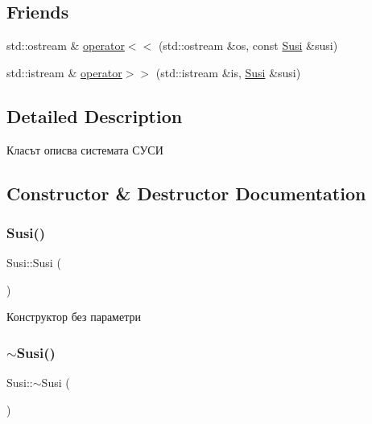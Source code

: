 \subsection*{Friends}
\begin{DoxyCompactItemize}
\item 
std\+::ostream \& \hyperlink{class_susi_a19986b37cae9f955a39548b141c5505d}{operator$<$$<$} (std\+::ostream \&os, const \hyperlink{class_susi}{Susi} \&susi)
\item 
std\+::istream \& \hyperlink{class_susi_a2cc9661c48db37bc6a525e4fe567ec23}{operator$>$$>$} (std\+::istream \&is, \hyperlink{class_susi}{Susi} \&susi)
\end{DoxyCompactItemize}


\subsection{Detailed Description}
Класът описва системата СУСИ 

\subsection{Constructor \& Destructor Documentation}
\mbox{\label{class_susi_a787354112d858530b76a94845c47e99e}} 
\subsubsection{\texorpdfstring{Susi()}{Susi()}}
{\footnotesize\ttfamily Susi\+::\+Susi (\begin{DoxyParamCaption}{ }\end{DoxyParamCaption})}



Конструктор без параметри 

\mbox{\label{class_susi_ae91ce62ca3142f9f7f7c77749b0df03e}} 
\subsubsection{\texorpdfstring{$\sim$\+Susi()}{~Susi()}}
{\footnotesize\ttfamily Susi\+::$\sim$\+Susi (\begin{DoxyParamCaption}{ }\end{DoxyParamCaption})\hspace{0.3cm}{\ttfamily [default]}}



